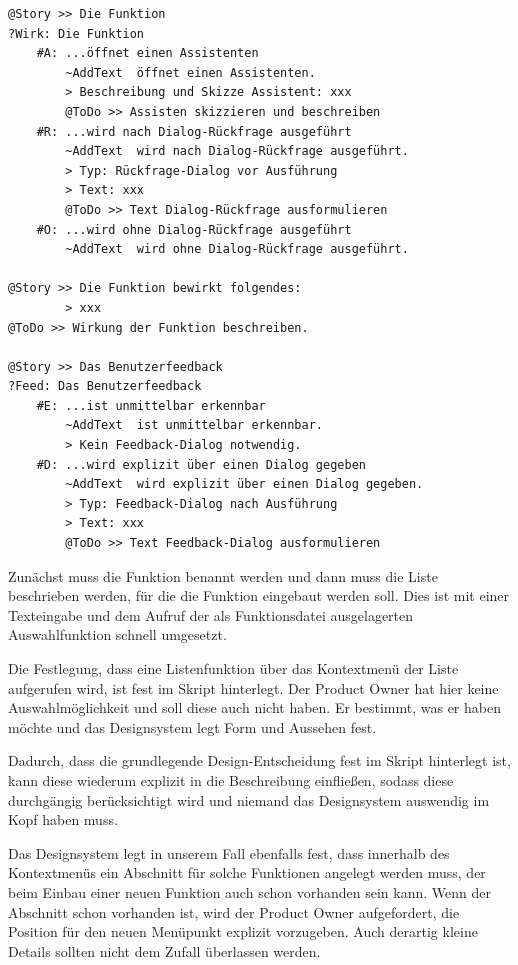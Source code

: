 \begin{verbatim}
@Story >> Die Funktion
?Wirk: Die Funktion
    #A: ...öffnet einen Assistenten
        ~AddText  öffnet einen Assistenten.
        > Beschreibung und Skizze Assistent: xxx
        @ToDo >> Assisten skizzieren und beschreiben
    #R: ...wird nach Dialog-Rückfrage ausgeführt
        ~AddText  wird nach Dialog-Rückfrage ausgeführt.
        > Typ: Rückfrage-Dialog vor Ausführung
        > Text: xxx
        @ToDo >> Text Dialog-Rückfrage ausformulieren
    #O: ...wird ohne Dialog-Rückfrage ausgeführt
        ~AddText  wird ohne Dialog-Rückfrage ausgeführt.

@Story >> Die Funktion bewirkt folgendes:
        > xxx
@ToDo >> Wirkung der Funktion beschreiben.

@Story >> Das Benutzerfeedback
?Feed: Das Benutzerfeedback
    #E: ...ist unmittelbar erkennbar
        ~AddText  ist unmittelbar erkennbar.
        > Kein Feedback-Dialog notwendig.
    #D: ...wird explizit über einen Dialog gegeben
        ~AddText  wird explizit über einen Dialog gegeben.
        > Typ: Feedback-Dialog nach Ausführung
        > Text: xxx
        @ToDo >> Text Feedback-Dialog ausformulieren
\end{verbatim}

Zunächst muss die Funktion benannt werden und dann muss die Liste beschrieben werden, für die die Funktion eingebaut werden soll. Dies ist mit einer Texteingabe und dem Aufruf der als Funktionsdatei ausgelagerten Auswahlfunktion schnell umgesetzt.

Die Festlegung, dass eine Listenfunktion über das Kontextmenü der Liste aufgerufen wird, ist fest im Skript hinterlegt. Der Product Owner hat hier keine Auswahlmöglichkeit und soll diese auch nicht haben. Er bestimmt, was er haben möchte und das Designsystem legt Form und Aussehen fest.

Dadurch, dass die grundlegende Design-Entscheidung fest im Skript hinterlegt ist, kann diese wiederum explizit in die Beschreibung einfließen, sodass diese durchgängig berücksichtigt wird und niemand das Designsystem auswendig im Kopf haben muss.

Das Designsystem legt in unserem Fall ebenfalls fest, dass innerhalb des Kontextmenüs ein Abschnitt für solche Funktionen angelegt werden muss, der beim Einbau einer neuen Funktion auch schon vorhanden sein kann. Wenn der Abschnitt schon vorhanden ist, wird der Product Owner aufgefordert, die Position für den neuen Menüpunkt explizit vorzugeben. Auch derartig kleine Details sollten nicht dem Zufall überlassen werden.

